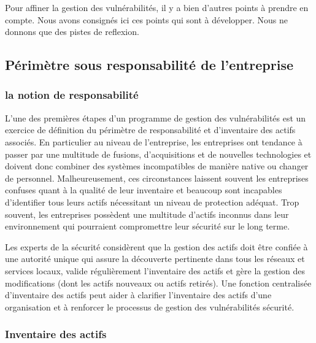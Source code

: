 

Pour affiner la gestion des vulnérabilités, il y a bien d'autres points à prendre en compte. Nous avons consignés ici ces points qui sont à développer. Nous ne donnons que des pistes de reflexion.
\subsection{Périmètre sous responsabilité de l’entreprise}

\subsubsection{la notion de responsabilité}

L'une des premières étapes d'un programme de gestion des vulnérabilités est un exercice de définition du périmètre de responsabilité et d'inventaire des actifs associés. En particulier au niveau de l'entreprise, les entreprises ont tendance à passer par une multitude de fusions, d'acquisitions et de nouvelles technologies et doivent donc combiner des systèmes incompatibles de manière native ou changer de personnel. Malheureusement, ces circonstances laissent souvent les entreprises confuses quant à la qualité de leur inventaire et beaucoup sont incapables d'identifier tous leurs actifs nécessitant un niveau de protection adéquat. Trop souvent, les entreprises possèdent une multitude d'actifs inconnus dans leur environnement qui pourraient compromettre leur sécurité sur le long terme.

Les experts de la sécurité considèrent que la gestion des actifs doit être confiée à une autorité unique qui assure la découverte pertinente dans tous les réseaux et services locaux, valide régulièrement l’inventaire des actifs et gère la gestion des modifications (dont les actifs nouveaux ou actifs retirés). Une fonction centralisée d’inventaire des actifs peut aider à clarifier l’inventaire des actifs d’une organisation et à renforcer le processus de gestion des vulnérabilités sécurité.


\subsubsection{Inventaire des actifs}

